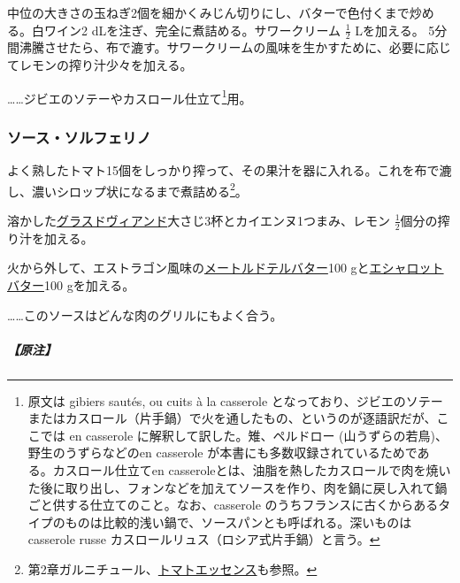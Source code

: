 \begin{recette}
中位の大きさの玉ねぎ2個を細かくみじん切りにし、バターで色付くまで炒める。白ワイン2
dLを注ぎ、完全に煮詰める。サワークリーム \(\frac{1}{2}\) Lを加える。
5分間沸騰させたら、布で漉す。サワークリームの風味を生かすために、必要に応じてレモンの搾り汁少々を加える。

\ldots{}\ldots{}ジビエのソテーやカスロール仕立て\footnote{原文は gibiers
  sautés, ou cuits à la casserole
  となっており、ジビエのソテーまたはカスロール（片手鍋）で火を通したもの、というのが逐語訳だが、ここでは
  en casserole に解釈して訳した。雉、ペルドロー
  (山うずらの若鳥)、野生のうずらなどのen casserole
  が本書にも多数収録されているためである。カスロール仕立てen
  casseroleとは、油脂を熱したカスロールで肉を焼いた後に取り出し、フォンなどを加えてソースを作り、肉を鍋に戻し入れて鍋ごと供する仕立てのこと。なお、casserole
  のうちフランスに古くからあるタイプのものは比較的浅い鍋で、ソースパンとも呼ばれる。深いものはcasserole
  russe カスロールリュス（ロシア式片手鍋）と言う。}用。

\hypertarget{sauce-solferino}{%
\subsubsection{ソース・ソルフェリノ}\label{sauce-solferino}}



よく熟したトマト15個をしっかり搾って、その果汁を器に入れる。これを布で漉し、濃いシロップ状になるまで煮詰める\footnote{第2章ガルニチュール、\protect\hyperlink{essence-de-tomate}{トマトエッセンス}も参照。}。

溶かした\protect\hyperlink{glace-de-viande}{グラスドヴィアンド}大さじ3杯とカイエンヌ1つまみ、レモン
\(\frac{1}{2}\)個分の搾り汁を加える。

火から外して、エストラゴン風味の\protect\hyperlink{beurre-maitre-d-hotel}{メートルドテルバター}100
gと\protect\hyperlink{beurre-d-echalote}{エシャロットバター}100
gを加える。

\ldots{}\ldots{}このソースはどんな肉のグリルにもよく合う。

\hypertarget{nota-sauce-solferino}{%
\subparagraph{【原注】}\label{nota-sauce-solferino}}


\end{recette}
